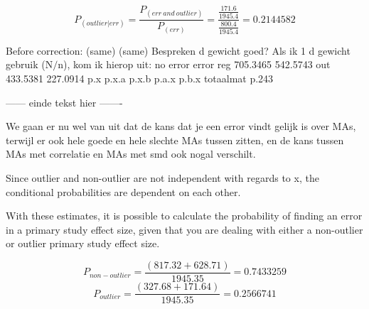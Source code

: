 \documentclass{article}
\begin{document}
\begin{equation*}
P_{(outlier|err)} =  \frac{P_{(err \ and \ outlier)}}{P_{(err)}}  =\frac{\frac{171.6}{1945.4}}{\frac{800.4}{1945.4}}=  0.2144582
\end{equation*}

Before correction:  (same)  (same)   \newline
Bespreken d gewicht goed?
Als ik 1 d gewicht gebruik (N$/$n), kom ik hierop uit:\newline
    no error    error\newline
reg 705.3465 542.5743\newline
out 433.5381 227.0914\newline
 p.x\newline
 p.x.a \newline
 p.x.b \newline
 p.a.x \newline
 p.b.x \newline
totaalmat\newline
p.243

------ einde tekst hier -------

We gaan er nu wel van uit dat de kans dat je een error vindt gelijk is over MAs, terwijl er ook hele goede en hele slechte MAs tussen zitten, en de kans tussen MAs met correlatie en MAs met smd ook nogal verschilt.

Since outlier and non-outlier are not independent with regards to x, the conditional probabilities are dependent on each other.


With these estimates, it is possible to calculate the probability of finding an error in a primary study effect size, given that you are dealing with either a non-outlier or outlier primary study effect size.


\begin{equation*}
P_{non-outlier} = \frac{(817.32 + 628.71)}{1945.35} = 0.7433259
\end{equation*}
\begin{equation*}
P_{outlier} = \frac{(327.68 + 171.64)}{1945.35} = 0.2566741
\end{equation*}



\vspace{3mm}
\end{document}
